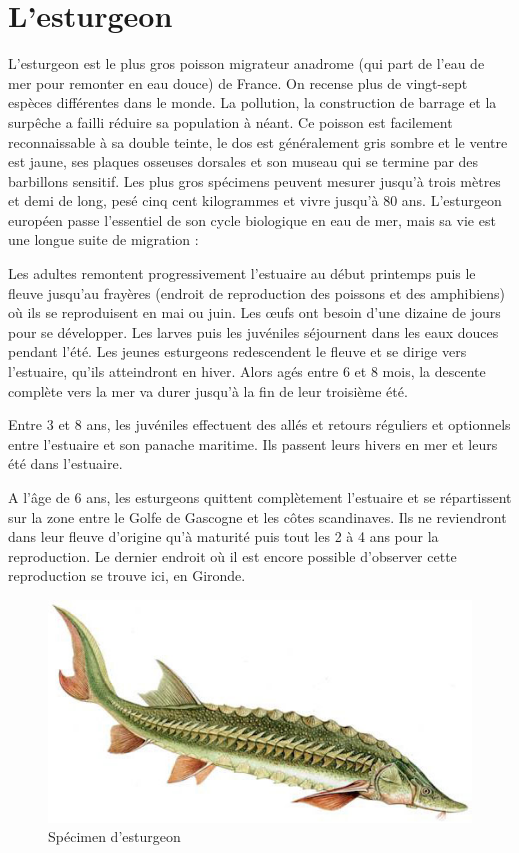 \documentclass[12pt,a4paper,titlepage,twoside]{report}
\begin{document}
\section{L'esturgeon}
L'esturgeon est le plus gros poisson migrateur anadrome (qui part de l'eau de mer pour remonter en eau douce) de France. On recense plus de vingt-sept espèces différentes dans le monde. La pollution, la construction de barrage et la surpêche a failli réduire sa population à néant. Ce poisson est facilement reconnaissable à sa double teinte, le dos est généralement gris sombre et le ventre est jaune, ses plaques osseuses dorsales et son museau qui se termine par des barbillons sensitif. Les plus gros spécimens peuvent mesurer jusqu'à trois mètres et demi de long, pesé cinq cent kilogrammes et vivre jusqu'à 80 ans.
L'esturgeon européen passe l'essentiel de son cycle biologique en eau de mer, mais sa vie est une longue suite de migration : 

Les adultes remontent progressivement l'estuaire au début printemps puis le fleuve jusqu'au frayères (endroit de reproduction des poissons et des amphibiens) où ils se reproduisent en mai ou juin. Les œufs ont besoin d'une dizaine de jours pour se développer.
Les larves puis les juvéniles séjournent dans les eaux douces pendant l'été. Les jeunes esturgeons redescendent le fleuve et se dirige vers l'estuaire, qu'ils atteindront en hiver. Alors agés entre 6 et 8 mois, la descente complète vers la mer va durer jusqu'à la fin de leur troisième été.

Entre 3 et 8 ans, les juvéniles effectuent des allés et retours réguliers et optionnels entre l'estuaire et son panache maritime. Ils passent leurs hivers en mer et leurs été dans l'estuaire.

A l'âge de 6 ans, les esturgeons quittent complètement l'estuaire et se répartissent sur la zone entre le Golfe de Gascogne et les côtes scandinaves. Ils ne reviendront dans leur fleuve d'origine qu'à maturité  puis tout les 2 à 4 ans pour la reproduction. Le dernier endroit où il est encore possible d'observer cette reproduction se trouve ici, en Gironde.
\begin{figure}[h]
\centering
\includegraphics[scale={0.5}]{pictures/esturgeon.jpg}
\caption{Spécimen d'esturgeon}
\end{figure}
\clearpage
\end{document}
